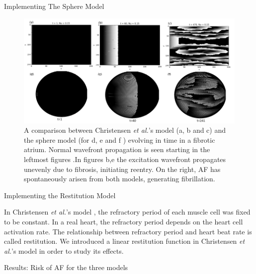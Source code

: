 \documentclass[final,hyperref={pdfpagelabels=false}]{beamer}
\begin{document}
\begin{frame}[t]
\begin{columns}[t]
\begin{column}{.465\textwidth}
\begin{block}{Implementing The Sphere Model}
\begin{figure}
\includegraphics[width=0.8\linewidth]{combchristensenspherefib}
\caption{A comparison between Christensen \emph{et al.}'s model  (a, b and c)  and the sphere model (for d, e and f ) evolving in time in a fibrotic atrium. Normal wavefront propagation is seen starting in the leftmost figures .In figures b,e the excitation wavefront propagates unevenly due to fibrosis, initiating reentry. On the right, AF has spontaneously arisen from both models, generating fibrillation.}
\end{figure}

\end{block}

\begin{block}{Implementing the Restitution Model}

In Christensen \emph{et al.}'s model \cite{Christensen}, the refractory period of each muscle cell was fixed to be constant.
In a real heart, the refractory period depends on the heart cell activation rate. The relationship between refractory period and heart beat rate is called restitution. We introduced a linear restitution function in  Christensen \emph{et al.}'s model in order to study its effects.
\end{block}


\begin{block}{Results: Risk of AF for the three models}


\end{block}
\end{column}
\end{columns}
\end{frame}
\end{document}
